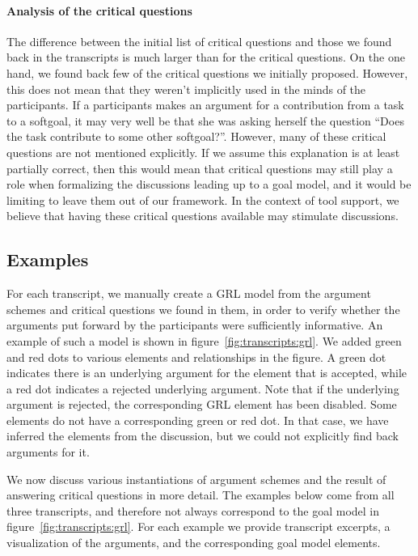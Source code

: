 \paragraph{Analysis of the critical questions} The difference between the initial list of critical questions and those we found back in the transcripts is much larger than for the critical questions. On the one hand, we found back few of the critical questions we initially proposed. However, this does not mean that they weren't implicitly used in the minds of the participants. If a participants makes an argument for a contribution from a task to a softgoal, it may very well be that she was asking herself the question ``Does the task contribute to some other softgoal?''. However, many of these critical questions are not mentioned explicitly. If we assume this explanation is at least partially correct, then this would mean that critical questions may still play a role when formalizing the discussions leading up to a goal model, and it would be limiting to leave them out of our framework. In the context of tool support, we believe that having these critical questions available may stimulate discussions.

\subsection{Examples}

For each transcript, we manually create a GRL model from the argument schemes and critical questions we found in them, in order to verify whether the arguments put forward by the participants were sufficiently informative. An example of such a model is shown in figure~\ref{fig:transcripts:grl}. We added green and red dots to various elements and relationships in the figure. A green dot indicates there is an underlying argument for the element that is accepted, while a red dot indicates a rejected underlying argument. Note that if the underlying argument is rejected, the corresponding GRL element has been disabled. Some elements do not have a corresponding green or red dot. In that case, we have inferred the elements from the discussion, but we could not explicitly find back arguments for it.

We now discuss various instantiations of argument schemes and the result of answering critical questions in more detail. The examples below come from all three transcripts, and therefore not always correspond to the goal model in figure~\ref{fig:transcripts:grl}. For each example we provide transcript excerpts, a visualization of the arguments, and the corresponding goal model elements.

